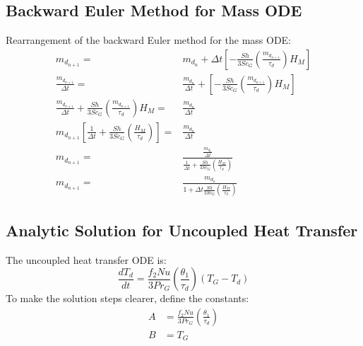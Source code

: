 \documentclass[../Interim_Report_Master]{subfiles}
\begin{document}
\subsection{Backward Euler Method for Mass ODE}\label{back_euler_mass_dev}
Rearrangement of the backward Euler method for the mass ODE:
\begin{subequations}
\begin{align}
m_{d_{n+1}} =& m_{d_{n}} + \Delta t \left[-\frac{Sh}{3Sc_{G}}\left(\frac{m_{d_{n+1}}}{\tau_{d}}\right)H_M\right] \\
\frac{m_{d_{n+1}}}{\Delta t} =& \frac{m_{d_{n}}}{\Delta t}+  \left[-\frac{Sh}{3Sc_{G}}\left(\frac{m_{d_{n+1}}}{\tau_{d}}\right)H_M\right] \\
\frac{m_{d_{n+1}}}{\Delta t} + \frac{Sh}{3Sc_{G}}\left(\frac{m_{d_{n+1}}}{\tau_{d}}\right)H_M =& \frac{m_{d_{n}}}{\Delta t} \\
m_{d_{n+1}}\left[\frac{1}{\Delta t} + \frac{Sh}{3Sc_{G}}\left(\frac{H_M}{\tau_{d}}\right)\right] =& \frac{m_{d_{n}}}{\Delta t} \\
m_{d_{n+1}} =& \frac{\frac{m_{d_{n}}}{\Delta t}}{\frac{1}{\Delta t} + \frac{Sh}{3Sc_{G}}\left(\frac{H_M}{\tau_{d}}\right)} \\
m_{d_{n+1}} =& \frac{m_{d_{n}}}{1+ \Delta t\frac{Sh}{3Sc_{G}}\left(\frac{H_M}{\tau_{d}}\right)} 
\end{align}
\end{subequations}

\subsection{Analytic Solution for Uncoupled Heat Transfer}\label{uc_heat_dev}
The uncoupled heat transfer ODE is:
\begin{equation}
\frac{dT_{d}}{dt} = \frac{f_{2}Nu}{3Pr_{G}}\left(\frac{\theta_1}{\tau_d}\right)(T_{G}-T_{d})
\end{equation}
To make the solution steps clearer, define the constants:
\begin{subequations}
\begin{align}
A &= \frac{f_{2}Nu}{3Pr_{G}}\left(\frac{\theta_1}{\tau_d}\right) \\
B &= T_G
\end{align}
\end{subequations}
\end{document}

